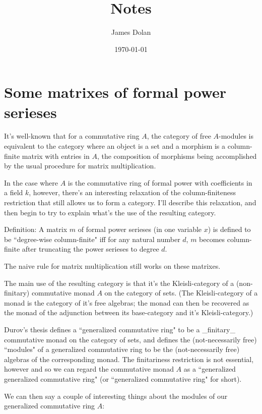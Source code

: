 \documentclass[11pt,oneside]{article}
\title{Notes}
\author{James Dolan}
\date{\today}
\begin{document}
\maketitle

%
%

\section{Some matrixes of formal power serieses}


It's well-known that for a commutative ring $A$, the category of free
$A$-modules is equivalent to the category where an object is a set and a
morphism is a column-finite matrix with entries in $A$, the composition
of morphisms being accomplished by the usual procedure for matrix
multiplication.

In the case where $A$ is the commutative ring of formal power with
coefficients in a field $k$, however, there's an interesting relaxation
of the column-finiteness restriction that still allows us to form a
category.  I'll describe this relaxation, and then begin to try to
explain what's the use of the resulting category.

Definition: A matrix $m$ of formal power serieses (in one variable $x$) is
defined to be ``degree-wise column-finite" iff for any natural number
$d$, $m$ becomes column-finite after truncating the power serieses to
degree $d$.

The naive rule for matrix multiplication still works on these matrixes.

The main use of the resulting category is that it's the
Kleisli-category of a (non-finitary) commutative monad $A$ on the
category of sets.  (The Kleisli-category of a monad is the category of
it's free algebras; the monad can then be recovered as the monad of
the adjunction between its base-category and it's Kleisli-category.)

Durov's thesis \cite{Durov2007} defines a ``generalized commutative ring" to be a
\_finitary\_ commutative monad on the category of sets, and defines the
(not-necessarily free) ``modules" of a generalized commutative ring to
be the (not-necessarily free) algebras of the corresponding monad.
The finitariness restriction is not essential, however and so we can
regard the commutative monad $A$ as a ``generalized generalized
commutative ring" (or ``generalized commutative ring" for short).

We can then say a couple of interesting things about the modules of
our generalized commutative ring $A$:
\end{document}

